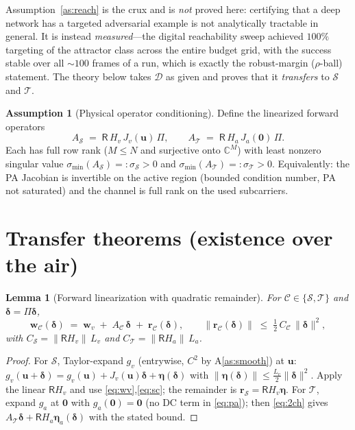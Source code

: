 \documentclass[11pt]{article}
\newtheorem{lemma}[theorem]{Lemma}
\theoremstyle{definition}
\newtheorem{assumption}{Assumption}
\newcommand{\C}{\mathbb{C}}
\newcommand{\norm}[1]{\lVert #1 \rVert}
\newcommand{\Rx}{\mathsf{R}}
\newcommand{\bu}{\bm{u}}
\newcommand{\bw}{\bm{w}}
\newcommand{\bd}{\bm{\delta}}
\newcommand{\smin}{\sigma_{\min}}
\begin{document}
\noindent
Assumption~\ref{as:reach} is the crux and is \emph{not} proved here: certifying that a deep
network has a targeted adversarial example is not analytically tractable in general. It is
instead \emph{measured}---the digital reachability sweep achieved $100\%$ targeting of the
attractor class across the entire budget grid, with the success stable over all $\sim\!100$
frames of a run, which is exactly the robust-margin ($\rho$-ball) statement. The theory below
takes $\mathcal D$ as given and proves that it \emph{transfers} to $\mathcal S$ and $\mathcal T$.

\begin{assumption}[Physical operator conditioning]\label{as:cond}
Define the linearized forward operators
\[
  A_{\mathcal S} \;=\; \Rx\,H_v\,J_v(\bu)\,\Pi, \qquad
  A_{\mathcal T} \;=\; \Rx\,H_a\,J_a(\bm 0)\,\Pi .
\]
Each has full row rank ($M\le N$ and surjective onto $\C^{M}$) with least nonzero singular
value $\smin(A_{\mathcal S})=:\sigma_{\mathcal S}>0$ and
$\smin(A_{\mathcal T})=:\sigma_{\mathcal T}>0$. Equivalently: the PA Jacobian is invertible on
the active region (bounded condition number, PA not saturated) and the channel is full rank on
the used subcarriers.
\end{assumption}

\section{Transfer theorems (existence over the air)}

\begin{lemma}[Forward linearization with quadratic remainder]\label{lem:lin}
For $\mathcal C\in\{\mathcal S,\mathcal T\}$ and $\bd=\Pi\bd$,
\[
  \bw_{\mathcal C}(\bd) \;=\; \bw_v \;+\; A_{\mathcal C}\,\bd \;+\; \bm r_{\mathcal C}(\bd),
  \qquad
  \norm{\bm r_{\mathcal C}(\bd)} \;\le\; \tfrac12\, C_{\mathcal C}\,\norm{\bd}^2,
\]
with $C_{\mathcal S}=\norm{\Rx H_v}\,L_v$ and $C_{\mathcal T}=\norm{\Rx H_a}\,L_a$.
\end{lemma}

\begin{proof}
For $\mathcal S$, Taylor-expand $g_v$ (entrywise, $C^2$ by A\ref{as:smooth}) at $\bu$:
$g_v(\bu+\bd)=g_v(\bu)+J_v(\bu)\bd+\bm\eta(\bd)$ with
$\norm{\bm\eta(\bd)}\le\frac{L_v}{2}\norm{\bd}^2$. Apply the linear $\Rx H_v$ and use
\eqref{eq:wv},\eqref{eq:sc}; the remainder is $\bm r_{\mathcal S}=\Rx H_v\bm\eta$. For
$\mathcal T$, expand $g_a$ at $\bm 0$ with $g_a(\bm0)=\bm0$ (no DC term in \eqref{eq:pa}); then
\eqref{eq:2ch} gives $A_{\mathcal T}\bd+\Rx H_a\bm\eta_a(\bd)$ with the stated bound.
\end{proof}
\end{document}
